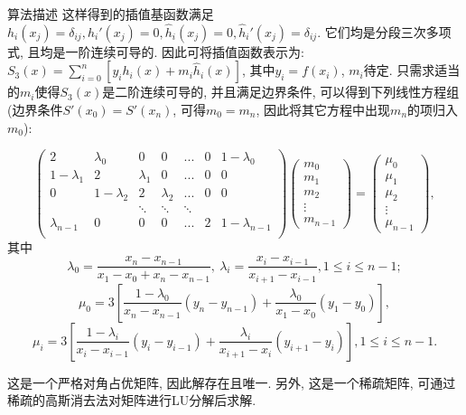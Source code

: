 \documentclass{article}
\begin{document}
\begin{section}{算法描述}
    这样得到的插值基函数满足$h_i(x_j) = \delta_{ij},h_i'(x_j)=0,\hat{h}_i(x_j)=0,\hat{h}_i'(x_j)=\delta_{ij}$. 它们均是分段三次多项式, 且均是一阶连续可导的. 因此可将插值函数表示为:
    $S_3(x) = \sum_{i=0}^n[y_ih_i(x)+m_i\hat{h}_i(x)]$, 其中$y_i = f(x_i)$, $m_i$待定. 只需求适当的$m_i$使得$S_3(x)$是二阶连续可导的, 并且满足边界条件, 可以得到下列线性方程组(边界条件$S'(x_0)=S'(x_n)$, 
    可得$m_0=m_n$, 因此将其它方程中出现$m_n$的项归入$m_0$):

    $$\begin{pmatrix}
        2 & \lambda_0 & 0 & 0 & ... & 0 & 1-\lambda_0 \\
        1-\lambda_1 & 2 & \lambda_1 & 0 &... &0 & 0 \\
        0 & 1-\lambda_2 & 2 & \lambda_2 &... &0 & 0 \\
         & & \ddots & \ddots & \ddots & &\\
        \lambda_{n-1} & 0 & 0 & 0 &... & 2 & 1-\lambda_{n-1} \\
    \end{pmatrix}
    \begin{pmatrix}
        m_0\\m_1\\m_2\\ \vdots \\m_{n-1}
    \end{pmatrix} = 
    \begin{pmatrix}
        \mu_0\\\mu_1\\\mu_2\\\vdots \\\mu_{n-1}
    \end{pmatrix},$$
    其中$$\lambda_0 = \dfrac{x_n-x_{n-1}}{x_1-x_0+x_n-x_{n-1}},\ \lambda_i = \dfrac{x_i-x_{i-1}}{x_{i+1}-x_{i-1}},1\leq i\leq n-1;$$
    $$\mu_0 = 3[\frac{1-\lambda_0}{x_n-x_{n-1}}(y_n-y_{n-1})+\frac{\lambda_0}{x_1-x_0}(y_1-y_0)],$$
    $$\mu_i = 3[\frac{1-\lambda_i}{x_i-x_{i-1}}(y_i-y_{i-1})+\frac{\lambda_i}{x_{i+1}-x_i}(y_{i+1}-y_i)],1\leq i\leq n-1.$$
    
    这是一个严格对角占优矩阵, 因此解存在且唯一. 另外, 这是一个稀疏矩阵, 可通过稀疏的高斯消去法对矩阵进行LU分解后求解.
    

\end{section}
\end{document}
